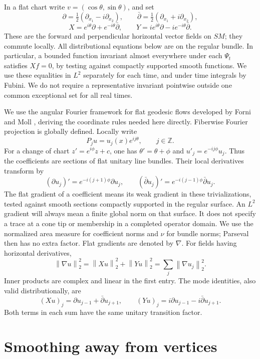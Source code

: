 \documentclass[11pt]{article}
\theoremstyle{remark}
\newcommand{\Z}{\mathbb Z}
\newcommand{\pa}{\partial}
\newcommand{\pb}{\bar\partial}
\newcommand{\norm}[1]{\left\lVert#1\right\rVert}
\begin{document}
In a flat chart write \(v=(\cos\theta,\sin\theta)\), and set
\[
 \pa=\tfrac12(\pa_{x_1}-i\pa_{x_2}),\qquad
 \pb=\tfrac12(\pa_{x_1}+i\pa_{x_2}),
\]
\begin{equation}\label{eq:XY}
 X=e^{i\theta}\pa+e^{-i\theta}\pb,\qquad
 Y=i e^{i\theta}\pa-i e^{-i\theta}\pb.
\end{equation}
These are the forward and perpendicular horizontal vector fields on
\(SM\); they commute locally. All distributional equations below are
on the regular bundle. In particular, a bounded function invariant
almost everywhere under each \(\Psi_t\) satisfies \(Xf=0\), by testing
against compactly supported smooth functions.
We use these equalities in \(L^2\) separately for each time, and under
time integrals by Fubini. We do not require a representative invariant
pointwise outside one common exceptional set for all real times.

We use the angular Fourier framework for flat geodesic flows developed
by Forni and Moll \cite[Sections~3.2--3.5]{FM}, deriving the coordinate
rules needed here directly. Fiberwise Fourier projection is globally
defined. Locally write
\[
 P_j u=u_j(x)e^{ij\theta},\qquad j\in\Z.
\]
For a change of chart \(z'=e^{i\phi}z+c\), one has
\(\theta'=\theta+\phi\) and \(u'_j=e^{-ij\phi}u_j\).
Thus the coefficients are sections of flat unitary line bundles.
Their local derivatives transform by
\[
 (\pa u_j)'=e^{-i(j+1)\phi}\pa u_j,\qquad
 (\pb u_j)'=e^{-i(j-1)\phi}\pb u_j.
\]
The flat gradient of a coefficient means its weak gradient in these
trivializations, tested against smooth sections compactly supported
in the regular surface. An \(L^2\) gradient will always mean a finite
global norm on that surface. It does not specify a trace at a cone tip
or membership in a completed operator domain.
We use the normalized area measure for coefficient norms and \(\nu\)
for bundle norms; Parseval then has no extra factor. Flat gradients
are denoted by \(\nabla\). For fields having horizontal derivatives,
\[
 \norm{\nabla u}_2^2=\norm{Xu}_2^2+\norm{Yu}_2^2
       =\sum_j\norm{\nabla u_j}_2^2.
\]
Inner products are complex and linear in the first entry. The mode
identities, also valid distributionally, are
\begin{equation}\label{eq:modes}
 (Xu)_j=\pa u_{j-1}+\pb u_{j+1},\qquad
 (Yu)_j=i\pa u_{j-1}-i\pb u_{j+1}.
\end{equation}
Both terms in each sum have the same unitary transition factor.

\section{Smoothing away from vertices}\label{sec:smoothing}
\end{document}
